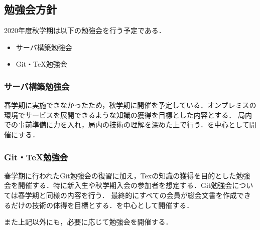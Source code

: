 \subsection*{勉強会方針}


2020年度秋学期は以下の勉強会を行う予定である．
\begin{itemize}
	\item サーバ構築勉強会
	\item Git・TeX勉強会
\end{itemize}
	\subsubsection*{サーバ構築勉強会}
		春学期に実施できなかったため，秋学期に開催を予定している．オンプレミスの環境でサービスを展開できるような知識の獲得を目標とした内容とする．
		局内での事前準備に力を入れ，局内の技術の理解を深めた上で行う．\secondGrade{}を中心として開催にする．
	\subsubsection*{Git・TeX勉強会}
 		春学期に行われたGit勉強会の復習に加え，Texの知識の獲得を目的とした勉強会を開催する．特に新入生や秋学期入会の参加者を想定する．Git勉強会については春学期と同様の内容を行う．
		最終的にすべての会員が総会文書を作成できるだけの技術の体得を目標とする．\secondGrade{}を中心として開催する．

また上記以外にも，必要に応じて勉強会を開催する．
